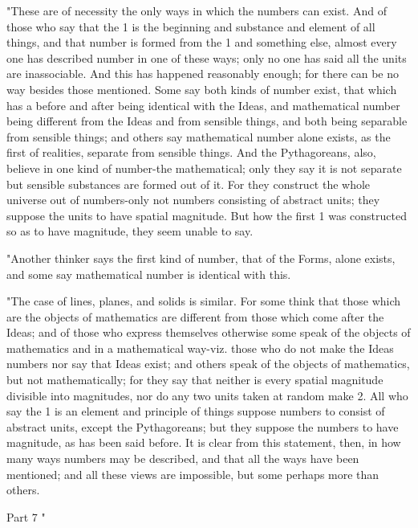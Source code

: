 "These are of necessity the only ways in which the numbers can exist.
And of those who say that the 1 is the beginning and substance and
element of all things, and that number is formed from the 1 and something
else, almost every one has described number in one of these ways;
only no one has said all the units are inassociable. And this has
happened reasonably enough; for there can be no way besides those
mentioned. Some say both kinds of number exist, that which has a before
and after being identical with the Ideas, and mathematical number
being different from the Ideas and from sensible things, and both
being separable from sensible things; and others say mathematical
number alone exists, as the first of realities, separate from sensible
things. And the Pythagoreans, also, believe in one kind of number-the
mathematical; only they say it is not separate but sensible substances
are formed out of it. For they construct the whole universe out of
numbers-only not numbers consisting of abstract units; they suppose
the units to have spatial magnitude. But how the first 1 was constructed
so as to have magnitude, they seem unable to say. 

"Another thinker says the first kind of number, that of the Forms,
alone exists, and some say mathematical number is identical with this.

"The case of lines, planes, and solids is similar. For some think
that those which are the objects of mathematics are different from
those which come after the Ideas; and of those who express themselves
otherwise some speak of the objects of mathematics and in a mathematical
way-viz. those who do not make the Ideas numbers nor say that Ideas
exist; and others speak of the objects of mathematics, but not mathematically;
for they say that neither is every spatial magnitude divisible into
magnitudes, nor do any two units taken at random make 2. All who say
the 1 is an element and principle of things suppose numbers to consist
of abstract units, except the Pythagoreans; but they suppose the numbers
to have magnitude, as has been said before. It is clear from this
statement, then, in how many ways numbers may be described, and that
all the ways have been mentioned; and all these views are impossible,
but some perhaps more than others. 

Part 7 "

